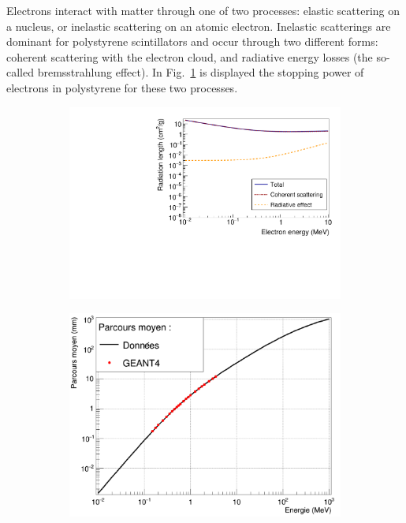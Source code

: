 Electrons interact with matter through one of two processes: elastic scattering on a nucleus, or inelastic scattering on an atomic electron.
Inelastic scatterings are dominant for polystyrene scintillators and occur through two different forms: coherent scattering with the electron cloud, and radiative energy losses (the so-called bremsstrahlung effect).
In Fig.~\ref{subfig:electron_attenuation} is displayed the stopping power of electrons in polystyrene for these two processes.
\begin{figure}[h]
  \centering
  \begin{subfigure}[t]{0.48\textwidth}
    \centering
    \includegraphics[width=1\textwidth]{commissioning/fig_commissioning/electron_energy_loss.pdf}
    \captionsetup{justification=centering}
    \caption{
      \label{subfig:electron_attenuation}}
  \end{subfigure}
  \hfill
  \begin{subfigure}[t]{0.48\textwidth}
    \centering
    \includegraphics[width=1\textwidth]{commissioning/fig_commissioning/free_path_electrons.pdf}

\end{subfigure}
\end{figure}
